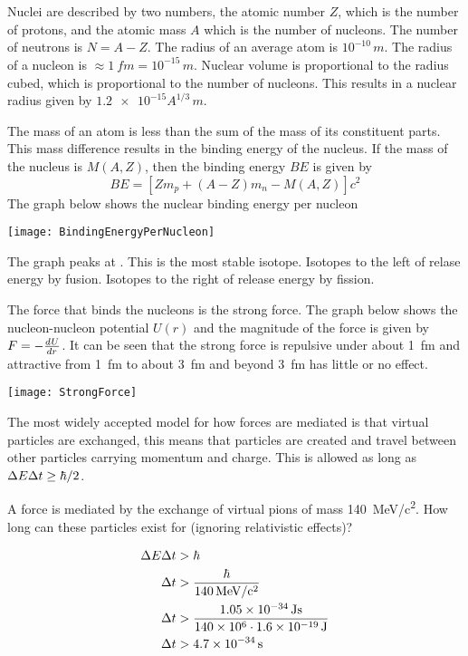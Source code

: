 \section{}

Nuclei are described by two numbers, the atomic number \(Z\), which is the number of protons, and the atomic mass \(A\) which is the number of nucleons. The number of neutrons is \(N=A-Z\). The radius of an average atom is \(10^{-10}\,\si{m}\). The radius of a nucleon is \(\approx\SI{1}{fm}=10^{-15}\,\si{m}\). Nuclear volume is proportional to the radius cubed, which is proportional to the number of nucleons. This results in a nuclear radius given by \(\num{1.2e-15}A^{1/3}\,\si{m}\).

The mass of an atom is less than the sum of the mass of its constituent parts. This mass difference results in the binding energy of the nucleus. If the mass of the nucleus is \(M(A,Z)\), then the binding energy \(BE\) is given by
\[BE=[Zm_p+(A-Z)m_n-M(A,Z)]c^2\]
The graph below shows the nuclear binding energy per nucleon

\begin{center}
\texttt{[image: BindingEnergyPerNucleon]}
\end{center}

The graph peaks at . This is the most stable isotope. Isotopes to the left of  relase energy by fusion. Isotopes to the right of  release energy by fission.

The force that binds the nucleons is the strong force. The graph below shows the nucleon-nucleon potential \(U(r)\) and the magnitude of the force is given by \(F=-\dv Ur\). It can be seen that the strong force is repulsive under about \SI{1}{fm} and attractive from \SI{1}{fm} to about \SI{3}{fm} and beyond \SI{3}{fm} has little or no effect.

\begin{center}
\texttt{[image: StrongForce]}
\end{center}

The most widely accepted model for how forces are mediated is that virtual particles are exchanged, this means that particles are created and travel between other particles carrying momentum and charge. This is allowed as long as \(\Delta E\Delta t\ge\hb/2\).

\begin{example}
A force is mediated by the exchange of virtual pions of mass \SI{140}{MeV/c^2}. How long can these particles exist for (ignoring relativistic effects)?

\begin{align*}
\Delta E\Delta t&>\hb\\
\Delta t&>\frac{\hb}{\SI{140}{MeV/c^2}}\\
\Delta t&>\frac{\num{1.05e-34}\,\si{Js}}{\num{140e6}\cdot\num{1.6e-19}\,\si{J}}\\
\Delta t&>\num{4.7e-34}\,\si{s}
\end{align*}
\end{example}

